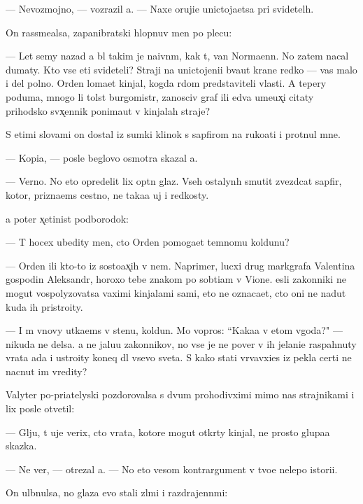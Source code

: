 \documentclass[10pt]{book}
\begin{document}
— Nevozmojno, — vozrazil {\y}a. — Naxe oruji{\y}e unictoja{\y}etsa pri svidetel{\ia}h.

On rassme{\y}alsa, zapanibratski hlopnuv men{\ia} po plecu:

— Let semy nazad {\y}a b{\yi}l takim je na{\y}ivn{\yi}m, kak t{\yi}, van Norma{\y}enn. No zatem nacal dumaty. Kto vse eti svideteli? Straji na unictojeni{\y}i b{\yi}va{\y}ut kra{\y}ne redko — vas malo i del polno. Orden loma{\y}et kinjal, kogda r{\ia}dom predstaviteli vlasti. A tepery poduma{\y}, mnogo li tolst{\yi}{\y} burgomistr, zanosciv{\yi}{\y} graf ili {\y}edva ume{\y}ux̨i{\y} citaty prihodsko{\y} sv{\ia}x̨ennik ponima{\y}ut v kinjalah straje{\y}?

S etimi slovami on dostal iz sumki klinok s sapfirom na ruko{\y}ati i prot{\ia}nul mne.

— Kopi{\y}a, — posle beglovo osmotra skazal {\y}a.

— Verno. No eto opredelit lix op{\yi}tn{\yi}{\y} glaz. Vseh ostalyn{\yi}h smutit zvezdcat{\yi}{\y} sapfir, kotor{\yi}{\y}, prizna{\y}ems{\ia} cestno, ne taka{\y}a uj i redkosty.

{\Y}a poter x̨etinist{\yi}{\y} podborodok:

— T{\yi} hocex ubedity men{\ia}, cto Orden pomoga{\y}et temnomu koldunu?

— Orden ili kto-to iz sosto{\y}ax̨ih v nem. Naprimer, lucxi{\y} drug markgrafa Valentina gospodin Aleksandr, horoxo tebe znakom{\yi}{\y} po sob{\yi}ti{\y}am v Vione. {\Y}esli zakonniki ne mogut vospolyzovatsa vaximi kinjalami sami, eto ne oznaca{\y}et, cto oni ne na{\y}dut kuda ih pristro{\y}ity.

— I m{\yi} vnovy ut{\yi}ka{\y}ems{\ia} v stenu, koldun. Mo{\y} vopros: ``Kaka{\y}a v etom v{\yi}goda?" — nikuda ne delsa. {\Y}a ne jalu{\y}u zakonnikov, no vse je ne pover{\iu} v ih jelani{\y}e raspahnuty vrata ada i ustro{\y}ity koneq dl{\ia} vsevo sveta. S kako{\y} stati v{\yi}rvavxi{\y}es{\ia} iz pekla certi ne nacnut im vredity?

Valyter po-pri{\y}atelyski pozdorovalsa s dvum{\ia} prohodivximi mimo nas strajnikami i lix posle otvetil:

— Gl{\ia}ju, t{\yi} uje verix, cto vrata, kotor{\yi}{\y}e mogut otkr{\yi}ty kinjal{\yi}, ne prosto glupa{\y}a skazka.

— Ne ver{\iu}, — otrezal {\y}a. — No eto vesom{\yi}{\y} kontrargument v tvo{\y}e{\y} nelepo{\y} istori{\y}i.

On ul{\yi}bnulsa, no glaza {\y}evo stali zl{\yi}mi i razdrajenn{\yi}mi:
\end{document}
